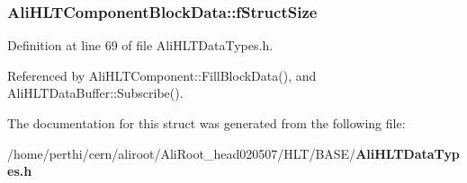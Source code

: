 \subsubsection{ {\bf Ali\-HLTComponent\-Block\-Data::f\-Struct\-Size}}\label{structAliHLTComponentBlockData_o0}




Definition at line 69 of file Ali\-HLTData\-Types.h.

Referenced by Ali\-HLTComponent::Fill\-Block\-Data(), and Ali\-HLTData\-Buffer::Subscribe().

The documentation for this struct was generated from the following file:\begin{CompactItemize}
\item 
/home/perthi/cern/aliroot/Ali\-Root\_\-head020507/HLT/BASE/{\bf Ali\-HLTData\-Types.h}\end{CompactItemize}
